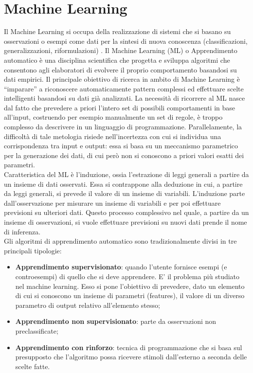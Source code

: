 \section{Machine Learning}
Il Machine Learning si occupa della realizzazione di sistemi che si basano su osservazioni o esempi come dati per la sintesi di nuova conoscenza (classificazioni, generalizzazioni, riformulazioni) \cite{10}. Il Machine Learning (ML) o Apprendimento automatico è una disciplina scientifica che progetta e sviluppa algoritmi che consentono agli elaboratori di evolvere il proprio comportamento basandosi su dati empirici. Il principale obiettivo di ricerca in ambito di Machine Learning è “imparare” a riconoscere automaticamente pattern complessi ed effettuare scelte intelligenti basandosi su dati già analizzati. La necessità di ricorrere al ML nasce dal fatto che prevedere a priori l'intero set di possibili comportamenti in base all'input, costruendo per esempio manualmente un set di regole, è troppo complesso da descrivere in un linguaggio di programmazione. Parallelamente, la difficoltà di tale metologia risiede nell'incertezza con cui si individua una corrispondenza tra input e output: essa si basa su un meccanismo parametrico per la generazione dei dati, di cui però non si conoscono a priori valori esatti dei parametri.\\
Caratteristica del ML è l'induzione, ossia l’estrazione di leggi generali a partire da un insieme di dati osservati. Essa si contrappone alla deduzione in cui, a partire da leggi generali, si prevede il valore di un insieme di variabili. L’induzione parte dall’osservazione per misurare un insieme di variabili e per poi effettuare previsioni su ulteriori dati. Questo processo complessivo nel quale, a partire da un insieme di osservazioni, si vuole effettuare previsioni su nuovi dati prende il nome di inferenza.\\
Gli algoritmi di apprendimento automatico sono tradizionalmente divisi in tre principali tipologie:
\begin{itemize}
	\item \textbf{Apprendimento supervisionato}: quando l'utente fornisce esempi (e controesempi) di quello che si deve apprendere. E' il problema più studiato	nel machine learning. Esso si pone l’obiettivo di prevedere, dato un
	elemento di cui si conoscono un insieme di parametri (features), il valore di un diverso parametro di output relativo all’elemento stesso;
	\item \textbf{Apprendimento non supervisionato}: parte da osservazioni non preclassificate;
	\item \textbf{Apprendimento con rinforzo}: tecnica di programmazione che si basa sul 	presupposto che l'algoritmo possa ricevere stimoli dall'esterno a seconda
	delle scelte fatte.
\end{itemize}
